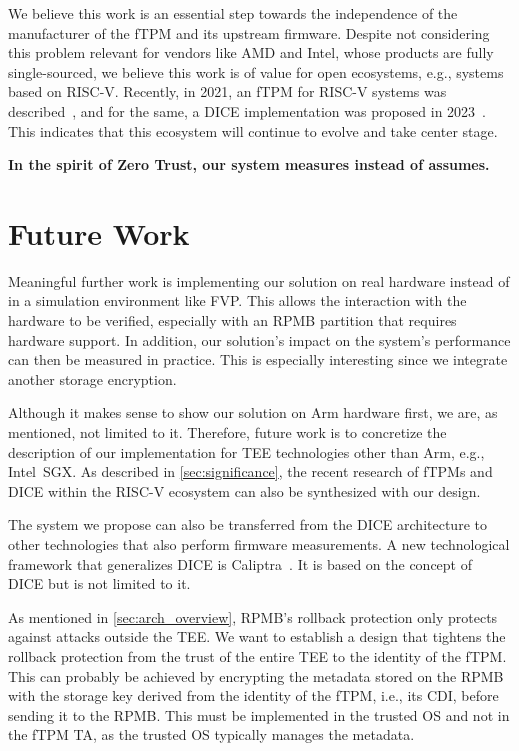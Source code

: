 We believe this work is an essential step towards the independence of the manufacturer of the \ac{fTPM} and its upstream firmware.
Despite not considering this problem relevant for vendors like AMD and Intel, whose products are fully single-sourced, we believe this work is of value for open ecosystems, e.g., systems based on RISC-V\@.
Recently, in 2021, an \ac{fTPM} for RISC-V systems was described~\cite{Boubakri2021}, and for the same, a \ac{DICE} implementation was proposed in 2023~\cite{Bravi2023}.
This indicates that this ecosystem will continue to evolve and take center stage.

\textbf{In the spirit of Zero Trust, our system measures instead of assumes.}

\section{Future Work}

Meaningful further work is implementing our solution on real hardware instead of in a simulation environment like FVP\@.
This allows the interaction with the hardware to be verified, especially with an RPMB partition that requires hardware support.
In addition, our solution's impact on the system's performance can then be measured in practice.
This is especially interesting since we integrate another storage encryption.

Although it makes sense to show our solution on Arm hardware first, we are, as mentioned, not limited to it.
Therefore, future work is to concretize the description of our implementation for TEE technologies other than Arm, e.g., Intel~SGX\@.
As described in \autoref{sec:significance}, the recent research of \acp{fTPM} and \ac{DICE} within the RISC-V ecosystem can also be synthesized with our design.

The system we propose can also be transferred from the \ac{DICE} architecture to other technologies that also perform firmware measurements.
A new technological framework that generalizes \ac{DICE} is Caliptra~\cite{caliptra}.
It is based on the concept of \ac{DICE} but is not limited to it.

As mentioned in \autoref{sec:arch_overview}, RPMB's rollback protection only protects against attacks outside the TEE\@.
We want to establish a design that tightens the rollback protection from the trust of the entire TEE to the identity of the fTPM\@.
This can probably be achieved by encrypting the metadata stored on the RPMB with the storage key derived from the identity of the fTPM, i.e., its CDI, before sending it to the RPMB\@.
This must be implemented in the trusted OS and not in the fTPM TA, as the trusted OS typically manages the metadata.

